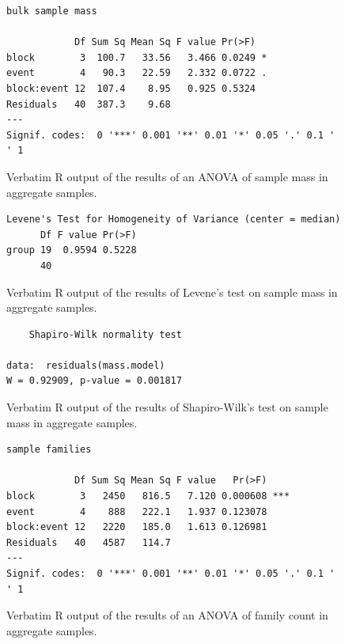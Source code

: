 \documentclass[10pt,letterpaper,twocolumn]{article}
\begin{document}
\begin{figure}[h]
	\lstset{numbers=left}
	\lstset{xleftmargin=5mm,framexleftmargin=5mm}
	\begin{lstlisting}
bulk sample mass 

            Df Sum Sq Mean Sq F value Pr(>F)  
block        3  100.7   33.56   3.466 0.0249 *
event        4   90.3   22.59   2.332 0.0722 .
block:event 12  107.4    8.95   0.925 0.5324  
Residuals   40  387.3    9.68                 
---
Signif. codes:  0 '***' 0.001 '**' 0.01 '*' 0.05 '.' 0.1 ' ' 1
	\end{lstlisting}
	\caption{Verbatim R output of the results of an ANOVA of sample mass in aggregate samples.}
	\label{fig:bulk_mass_anova}
	\smallskip
	\nointerlineskip
	\hrulefill
\end{figure}

\begin{figure}[h]
	\lstset{numbers=left}
	\lstset{xleftmargin=5mm,framexleftmargin=5mm}
	\begin{lstlisting}
Levene's Test for Homogeneity of Variance (center = median)
      Df F value Pr(>F)
group 19  0.9594 0.5228
      40               
	\end{lstlisting}
	\caption{Verbatim R output of the results of Levene's test on sample mass in aggregate samples.}
	\label{fig:bulk_mass_levene}
	\smallskip
	\nointerlineskip
	\hrulefill
\end{figure}

\begin{figure}[h]
	\lstset{numbers=left}
	\lstset{xleftmargin=5mm,framexleftmargin=5mm}
	\begin{lstlisting}
	Shapiro-Wilk normality test

data:  residuals(mass.model)
W = 0.92909, p-value = 0.001817
	\end{lstlisting}
	\caption{Verbatim R output of the results of Shapiro-Wilk's test on sample mass in aggregate samples.}
	\label{fig:bulk_mass_shapiro}
	\smallskip
	\nointerlineskip
	\hrulefill
\end{figure}

\begin{figure}[h]
	\lstset{numbers=left}
	\lstset{xleftmargin=5mm,framexleftmargin=5mm}
	\begin{lstlisting}
sample families 

            Df Sum Sq Mean Sq F value   Pr(>F)    
block        3   2450   816.5   7.120 0.000608 ***
event        4    888   222.1   1.937 0.123078    
block:event 12   2220   185.0   1.613 0.126981    
Residuals   40   4587   114.7                     
---
Signif. codes:  0 '***' 0.001 '**' 0.01 '*' 0.05 '.' 0.1 ' ' 1
	\end{lstlisting}
	\caption{Verbatim R output of the results of an ANOVA of family count in aggregate samples.}
	\label{fig:bulk_family_anova}
	\smallskip
	\nointerlineskip
	\hrulefill
\end{figure}
\end{document}
